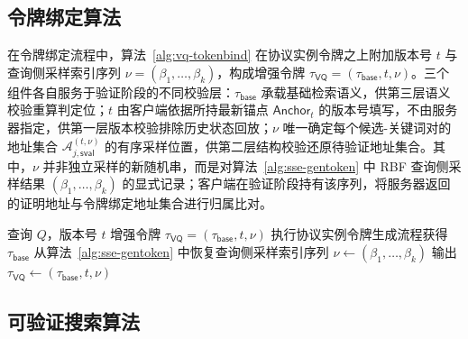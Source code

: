 \subsection{令牌绑定算法}

在令牌绑定流程中，算法~\ref{alg:vq-tokenbind} 在协议实例令牌之上附加版本号 $t$ 与查询侧采样索引序列 $\nu=(\beta_1,\ldots,\beta_k)$，构成增强令牌 $\tau_{\mathsf{VQ}}=(\tau_{\mathsf{base}},t,\nu)$。三个组件各自服务于验证阶段的不同校验层：$\tau_{\mathsf{base}}$ 承载基础检索语义，供第三层语义校验重算判定位；$t$ 由客户端依据所持最新锚点 $\mathsf{Anchor}_t$ 的版本号填写，不由服务器指定，供第一层版本校验排除历史状态回放；$\nu$ 唯一确定每个候选-关键词对的地址集合 $\mathcal{A}_{j,\mathsf{sval}}^{(t,\nu)}$ 的有序采样位置，供第二层结构校验还原待验证地址集合。其中，$\nu$ 并非独立采样的新随机串，而是对算法~\ref{alg:sse-gentoken} 中 RBF 查询侧采样结果 $(\beta_1,\ldots,\beta_k)$ 的显式记录；客户端在验证阶段持有该序列，将服务器返回的证明地址与令牌绑定地址集合进行归属比对。

\begin{algorithm}[h]
\caption{令牌绑定算法 $\mathsf{TokenBind}$}
\label{alg:vq-tokenbind}
\begin{algorithmic}[1]
\REQUIRE 查询 $Q$，版本号 $t$
\ENSURE 增强令牌 $\tau_{\mathsf{VQ}}=(\tau_{\mathsf{base}},t,\nu)$
\STATE 执行协议实例令牌生成流程获得 $\tau_{\mathsf{base}}$
\STATE 从算法~\ref{alg:sse-gentoken} 中恢复查询侧采样索引序列 $\nu\leftarrow(\beta_1,\ldots,\beta_k)$
\STATE 输出 $\tau_{\mathsf{VQ}}\leftarrow(\tau_{\mathsf{base}},t,\nu)$
\end{algorithmic}
\end{algorithm}

\subsection{可验证搜索算法}

